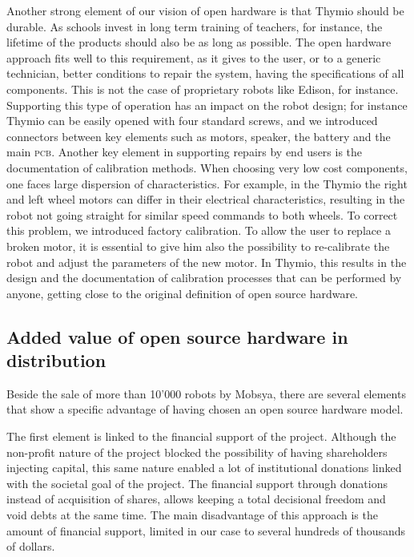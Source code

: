 \documentclass[letterpaper, 10 pt, conference]{ieeeconf}  %
\begin{document}
Another strong element of our vision of open hardware is that Thymio should be durable.
As schools invest in long term training of teachers, for instance, the lifetime of the products should also be as long as possible. 
The open hardware approach fits well to this requirement, as it gives to the user, or to a generic technician, better conditions to repair the system, having the specifications of all components. This is not the case of proprietary robots like Edison, for instance.
Supporting this type of operation has an impact on the robot design; for instance Thymio can be easily opened with four standard screws, and we introduced connectors between key elements such as motors, speaker, the battery and the main \textsc{pcb}.
Another key element in supporting repairs by end users is the documentation of calibration methods. 
When choosing very low cost components, one faces large dispersion of characteristics. 
For example, in the Thymio the right and left wheel motors can differ in their electrical characteristics, resulting in the robot not going straight for similar speed commands to both wheels.
To correct this problem, we introduced factory calibration. %
To allow the user to replace a broken motor, it is essential to give him also the possibility to re-calibrate the robot and adjust the parameters of the new motor.
In Thymio, this results in the design and the documentation of calibration processes that can be performed by anyone, getting close to the original definition of open source hardware.

\iffalse
\subsection{Added value of open source hardware in distribution}

Beside the sale of more than 10'000 robots by Mobsya, there are several elements that show a specific advantage of having chosen an open source hardware model.

The first element is linked to the financial support of the project.
Although the non-profit nature of the project blocked the possibility of having shareholders injecting capital, this same nature enabled a lot of institutional donations linked with the societal goal of the project.
The financial support through donations instead of acquisition of shares, allows keeping a total decisional freedom and void debts at the same time.
The main disadvantage of this approach is the amount of financial support, limited in our case to several hundreds of thousands of dollars. 
\end{document}
